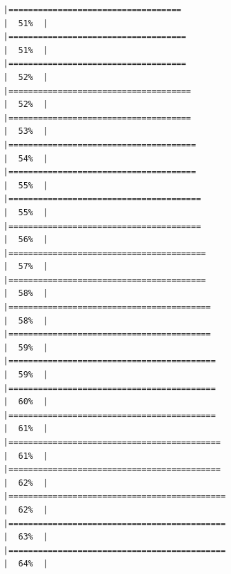 \documentclass[
  english,
  man,a4paper,mask,floatsintext]{apa6}
\begin{document}
\begin{verbatim}
|===================================                                   |  51%  |                                                                              |====================================                                  |  51%  |                                                                              |====================================                                  |  52%  |                                                                              |=====================================                                 |  52%  |                                                                              |=====================================                                 |  53%  |                                                                              |======================================                                |  54%  |                                                                              |======================================                                |  55%  |                                                                              |=======================================                               |  55%  |                                                                              |=======================================                               |  56%  |                                                                              |========================================                              |  57%  |                                                                              |========================================                              |  58%  |                                                                              |=========================================                             |  58%  |                                                                              |=========================================                             |  59%  |                                                                              |==========================================                            |  59%  |                                                                              |==========================================                            |  60%  |                                                                              |==========================================                            |  61%  |                                                                              |===========================================                           |  61%  |                                                                              |===========================================                           |  62%  |                                                                              |============================================                          |  62%  |                                                                              |============================================                          |  63%  |                                                                              |============================================                          |  64%  |                                                                              
\end{verbatim}
\end{document}
